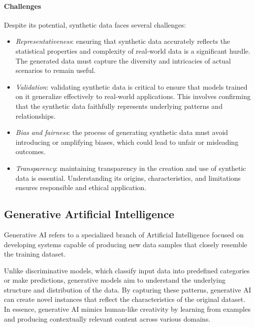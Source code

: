 \paragraph*{Challenges}
Despite its potential, synthetic data faces several challenges:
\begin{itemize}
    \item \textit{Representativeness}: ensuring that synthetic data accurately reflects the statistical properties and complexity of real-world data is a significant hurdle.
        The generated data must capture the diversity and intricacies of actual scenarios to remain useful.
    \item \textit{Validation}: validating synthetic data is critical to ensure that models trained on it generalize effectively to real-world applications. 
        This involves confirming that the synthetic data faithfully represents underlying patterns and relationships.
    \item \textit{Bias and fairness}: the process of generating synthetic data must avoid introducing or amplifying biases, which could lead to unfair or misleading outcomes.
    \item \textit{Transparency}: maintaining transparency in the creation and use of synthetic data is essential. 
        Understanding its origins, characteristics, and limitations ensures responsible and ethical application.
\end{itemize}

\subsection{Generative Artificial Intelligence}
\begin{definition}
    Generative AI refers to a specialized branch of Artificial Intelligence focused on developing systems capable of producing new data samples that closely resemble the training dataset.
\end{definition}
\noindent Unlike discriminative models, which classify input data into predefined categories or make predictions, generative models aim to understand the underlying structure and distribution of the data. 
By capturing these patterns, generative AI can create novel instances that reflect the characteristics of the original dataset.
In essence, generative AI mimics human-like creativity by learning from examples and producing contextually relevant content across various domains.

